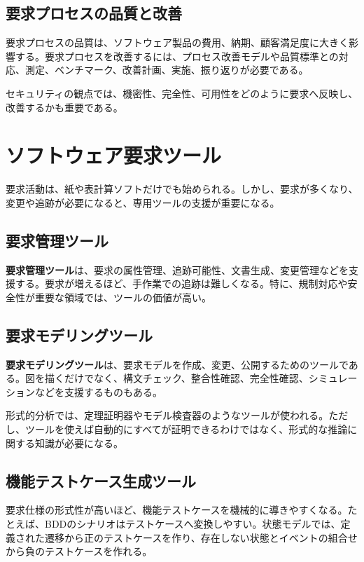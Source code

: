 \documentclass[uplatex,10pt,dvipdfmx,nomag]{jsarticle}
\newcommand{\term}[1]{\textbf{#1}}
\begin{document}
\subsection{要求プロセスの品質と改善}

要求プロセスの品質は、ソフトウェア製品の費用、納期、顧客満足度に大きく影響する。要求プロセスを改善するには、プロセス改善モデルや品質標準との対応、測定、ベンチマーク、改善計画、実施、振り返りが必要である。

セキュリティの観点では、機密性、完全性、可用性をどのように要求へ反映し、改善するかも重要である。

\section{ソフトウェア要求ツール}

要求活動は、紙や表計算ソフトだけでも始められる。しかし、要求が多くなり、変更や追跡が必要になると、専用ツールの支援が重要になる。

\subsection{要求管理ツール}

\term{要求管理ツール}は、要求の属性管理、追跡可能性、文書生成、変更管理などを支援する。要求が増えるほど、手作業での追跡は難しくなる。特に、規制対応や安全性が重要な領域では、ツールの価値が高い。

\subsection{要求モデリングツール}

\term{要求モデリングツール}は、要求モデルを作成、変更、公開するためのツールである。図を描くだけでなく、構文チェック、整合性確認、完全性確認、シミュレーションなどを支援するものもある。

形式的分析では、定理証明器やモデル検査器のようなツールが使われる。ただし、ツールを使えば自動的にすべてが証明できるわけではなく、形式的な推論に関する知識が必要になる。

\subsection{機能テストケース生成ツール}

要求仕様の形式性が高いほど、機能テストケースを機械的に導きやすくなる。たとえば、BDDのシナリオはテストケースへ変換しやすい。状態モデルでは、定義された遷移から正のテストケースを作り、存在しない状態とイベントの組合せから負のテストケースを作れる。
\end{document}
